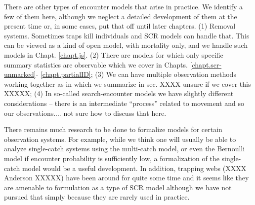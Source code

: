 There are other types of encounter models that arise in practice. We
identify a few of them here, although we neglect a detailed
development of them at the present time or, in some cases, put that
off until later chapters.  (1) Removal systems. Sometimes traps kill
individuals and SCR models can handle that. This can be viewed as a
kind of open model, with mortality only, and we handle such models in
Chapt. \ref{chapt.js}.
(2) There are models for which only
specific summary statistics are observable \citep{chandler_royle:2012}
which we cover in Chapts. \ref{chapt.scr-unmarked}-
\ref{chapt.partialID}; (3) We can have multiple observation methods
working together as in \citet{gopalaswamy_etal:2012} which we
summarize in sec. XXXX unsure if we cover this XXXXX; 
(4) In so-called search-encounter models we
have slightly different considerations -- there is an intermediate
``process'' related to movement and so our observations.... not sure
how to discuss that here.

There remains much research to be done to formalize models for certain
observation systems. For example, while we think one will usually be
able to analyze single-catch systems using the multi-catch model, or
even the Bernoulli model if encounter probability is sufficiently low, 
a formalization of the single-catch model would be a useful
development.   In addition, trapping webs (XXXX Anderson XXXXX) have
been around for quite some time and it seems like they are amenable to
formulation as a type of SCR model although we have not pursued that 
simply because they are rarely used in practice. 

